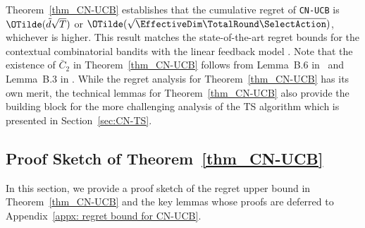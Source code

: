 \documentclass{article}
\theoremstyle{plain}
\begin{document}
%
Theorem~\ref{thm_CN-UCB} establishes that the cumulative regret of \texttt{CN-UCB} is $\OTilde(\tilde{d}\sqrt{T})$ or $\OTilde(\sqrt{ \EffectiveDim \TotalRound \SelectAction})$, whichever is higher. 
This result matches the state-of-the-art regret bounds for the contextual combinatorial bandits with the linear feedback model \cite{li2016contextual, zong2016cascading, li2018online}.
Note that the existence of $\bar{C}_2$ in Theorem~\ref{thm_CN-UCB} follows from Lemma~B.6 in~\citet{zhou2020neural} and Lemma~B.3 in \citet{cao2019generalization}. While the regret analysis for Theorem~\ref{thm_CN-UCB} has its own merit, the technical lemmas for Theorem~\ref{thm_CN-UCB} also provide the building block for the more challenging analysis of the TS algorithm which is presented in Section~\ref{sec:CN-TS}.

\subsection{Proof Sketch of Theorem~\ref{thm_CN-UCB}}
In this section, we provide a proof sketch of the regret upper bound in Theorem~\ref{thm_CN-UCB} and the key lemmas whose proofs are deferred to Appendix~\ref{appx: regret bound for CN-UCB}. 
\end{document}
